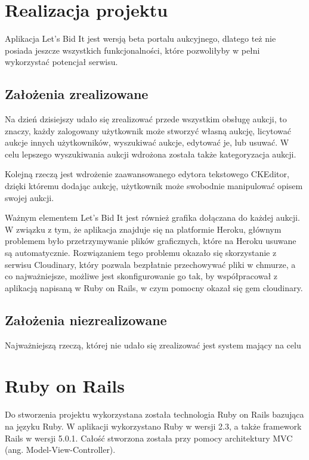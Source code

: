 \documentclass[brudnopis]{xmgr}
\begin{document}
\section{Realizacja projektu}

Aplikacja Let's Bid It jest wersją beta portalu aukcyjnego, dlatego też nie posiada jeszcze wszystkich funkcjonalności, które pozwoliłyby w pełni wykorzystać potencjał serwisu.

\subsection{Założenia zrealizowane}

Na dzień dzisiejszy udało się zrealizować przede wszystkim obsługę aukcji, to znaczy, każdy zalogowany użytkownik może stworzyć
własną aukcję, licytować aukcje innych użytkowników, wyszukiwać aukcje, edytować je, lub usuwać. W celu lepszego wyszukiwania aukcji wdrożona została także kategoryzacja aukcji.

Kolejną rzeczą jest wdrożenie zaawansowanego edytora tekstowego CKEditor, dzięki któremu dodając aukcję, użytkownik może swobodnie manipulować opisem swojej aukcji.

Ważnym elementem Let's Bid It jest również grafika dołączana do każdej aukcji. W związku z tym, że aplikacja znajduje się na platformie Heroku, głównym problemem było przetrzymywanie plików graficznych, które na Heroku usuwane są automatycznie. Rozwiązaniem tego problemu okazało się skorzystanie z serwisu Cloudinary, który pozwala bezpłatnie przechowywać pliki w chmurze, a co najważniejsze, możliwe jest skonfigurowanie go tak, by współpracował z aplikacją napisaną w Ruby on Rails, w czym pomocny okazał się gem cloudinary.



\subsection{Założenia niezrealizowane}

Najważniejszą rzeczą, której nie udało się zrealizować jest system mający na celu 

\section{Ruby on Rails}
Do stworzenia projektu wykorzystana została technologia Ruby on Rails bazująca na języku Ruby.
W aplikacji wykorzystano Ruby w wersji 2.3, a także framework Rails w wersji 5.0.1. Całość stworzona
została przy pomocy architektury MVC (ang. Model-View-Controller).
\end{document}
